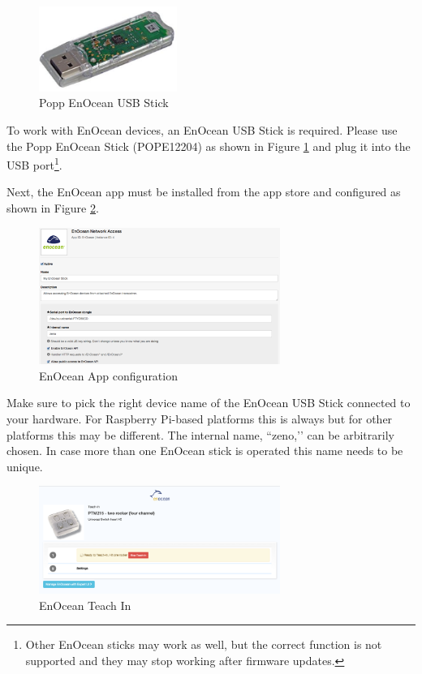 \begin{figure}
\begin{center}
\includegraphics[width=0.4\textwidth]{pngs/cap9/enocean1.png}
\caption{Popp EnOcean USB Stick}
\label{enocean1}
\end{center}
\end{figure}

To work with EnOcean devices, an EnOcean USB Stick is required. Please use the Popp 
EnOcean Stick (POPE12204) as shown in Figure \ref{enocean1} and plug it into the USB 
port\footnote{Other EnOcean sticks may work as well, but the correct function is not 
supported and they may stop working after \zway firmware updates.}.

Next, the EnOcean app must be installed from the app store and configured as 
shown in Figure \ref{enocean2}.

\begin{figure}
\begin{center}
\includegraphics[width=0.7\textwidth]{pngs/cap9/enocean2.png}
\caption{EnOcean App configuration}
\label{enocean2}
\end{center}
\end{figure}

Make sure to pick the right device name of the EnOcean USB Stick connected to your 
hardware. For Raspberry Pi-based platforms this is always  but for other 
platforms this may be different. The internal name, ``zeno,’’ can be arbitrarily chosen. 
In case more than one EnOcean stick is operated this name needs to be unique.

\begin{figure}
\begin{center}
\includegraphics[width=0.7\textwidth]{pngs/cap9/enocean3.png}
\caption{EnOcean Teach In}
\label{enocean3}
\end{center}
\end{figure}

